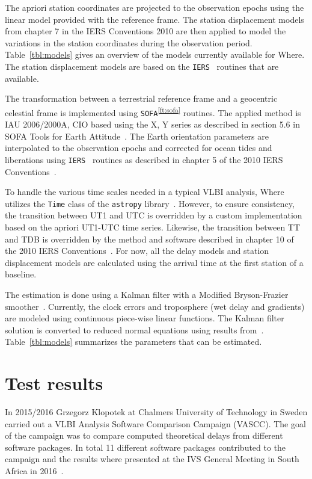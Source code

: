 \documentclass[natbib,twocolumn,twoside]{svmultiag}
\begin{document}
The apriori station coordinates are projected to the observation epochs using
the linear model provided with the reference frame. The station displacement
models from chapter 7 in the IERS Conventions 2010 are then applied to model the
variations in the station coordinates during the observation
period. Table~\ref{tbl:models} gives an overview of the models currently
available for Where. The station displacement models are based on the
\texttt{IERS}~\citep{iers_software} routines that are available.

The transformation between a terrestrial reference frame and a geocentric
celestial frame is implemented using
\texttt{SOFA}\textsuperscript{\ref{ft:sofa}} routines. The applied method is IAU
2006/2000A, CIO based using the X, Y series as described in section 5.6 in SOFA
Tools for Earth Attitude~\citep{sofa_tools}. The Earth orientation parameters
are interpolated to the observation epochs and corrected for ocean tides and
liberations using \texttt{IERS}~\citep{iers_software} routines as described in
chapter 5 of the 2010 IERS Conventions~\citep{iers2010}.

To handle the various time scales needed in a typical VLBI analysis, Where
utilizes the \texttt{Time} class of the \texttt{astropy}
library~\citep{astropy2013}. However, to ensure consistency, the transition
between UT1 and UTC is overridden by a custom implementation based on the
apriori UT1-UTC time series. Likewise, the transition between TT and TDB is
overridden by the method and software described in chapter 10 of the 2010 IERS
Conventions~\citep{iers2010}. For now, all the delay models and station
displacement models are calculated using the arrival time at the first station of
a baseline.

The estimation is done using a Kalman filter with a Modified Bryson-Frazier
smoother~\citep{bierman2006}. Currently, the clock errors and troposphere (wet
delay and gradients) are modeled using continuous piece-wise linear
functions. The Kalman filter solution is converted to reduced normal equations
using results from~\citep{mysen2017}. Table~\ref{tbl:models} summarizes the
parameters that can be estimated.

\section{Test results}
In 2015/2016 Grzegorz Klopotek at Chalmers University of Technology in Sweden
carried out a VLBI Analysis Software Comparison Campaign (VASCC). The goal of
the campaign was to compare computed theoretical delays from different software
packages. In total 11 different software packages contributed to the campaign
and the results where presented at the IVS General Meeting in South Africa in
2016~\citep{klopotek2016}.
\end{document}
